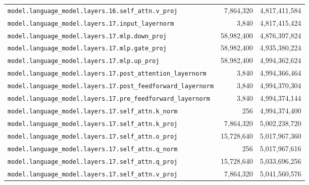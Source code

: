 \documentclass[10pt,a4paper]{article}
\theoremstyle{definition}
\begin{document}
\begin{appendices}
\begin{longtable}{p{9.5cm}rr}
\texttt{model.\allowbreak{}language\_model.\allowbreak{}layers.\allowbreak{}16.\allowbreak{}self\_attn.\allowbreak{}v\_proj} & 7,864,320 & 4,817,411,584 \\
\texttt{model.\allowbreak{}language\_model.\allowbreak{}layers.\allowbreak{}17.\allowbreak{}input\_layernorm} & 3,840 & 4,817,415,424 \\
\texttt{model.\allowbreak{}language\_model.\allowbreak{}layers.\allowbreak{}17.\allowbreak{}mlp.\allowbreak{}down\_proj} & 58,982,400 & 4,876,397,824 \\
\texttt{model.\allowbreak{}language\_model.\allowbreak{}layers.\allowbreak{}17.\allowbreak{}mlp.\allowbreak{}gate\_proj} & 58,982,400 & 4,935,380,224 \\
\texttt{model.\allowbreak{}language\_model.\allowbreak{}layers.\allowbreak{}17.\allowbreak{}mlp.\allowbreak{}up\_proj} & 58,982,400 & 4,994,362,624 \\
\texttt{model.\allowbreak{}language\_model.\allowbreak{}layers.\allowbreak{}17.\allowbreak{}post\_attention\_layernorm} & 3,840 & 4,994,366,464 \\
\texttt{model.\allowbreak{}language\_model.\allowbreak{}layers.\allowbreak{}17.\allowbreak{}post\_feedforward\_layernorm} & 3,840 & 4,994,370,304 \\
\texttt{model.\allowbreak{}language\_model.\allowbreak{}layers.\allowbreak{}17.\allowbreak{}pre\_feedforward\_layernorm} & 3,840 & 4,994,374,144 \\
\texttt{model.\allowbreak{}language\_model.\allowbreak{}layers.\allowbreak{}17.\allowbreak{}self\_attn.\allowbreak{}k\_norm} & 256 & 4,994,374,400 \\
\texttt{model.\allowbreak{}language\_model.\allowbreak{}layers.\allowbreak{}17.\allowbreak{}self\_attn.\allowbreak{}k\_proj} & 7,864,320 & 5,002,238,720 \\
\texttt{model.\allowbreak{}language\_model.\allowbreak{}layers.\allowbreak{}17.\allowbreak{}self\_attn.\allowbreak{}o\_proj} & 15,728,640 & 5,017,967,360 \\
\texttt{model.\allowbreak{}language\_model.\allowbreak{}layers.\allowbreak{}17.\allowbreak{}self\_attn.\allowbreak{}q\_norm} & 256 & 5,017,967,616 \\
\texttt{model.\allowbreak{}language\_model.\allowbreak{}layers.\allowbreak{}17.\allowbreak{}self\_attn.\allowbreak{}q\_proj} & 15,728,640 & 5,033,696,256 \\
\texttt{model.\allowbreak{}language\_model.\allowbreak{}layers.\allowbreak{}17.\allowbreak{}self\_attn.\allowbreak{}v\_proj} & 7,864,320 & 5,041,560,576 \\

\end{longtable}
\end{appendices}
\end{document}
